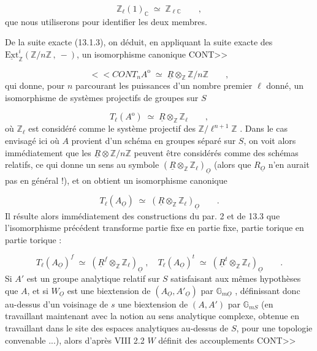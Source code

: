 \begin{equation*}
\mathbb{Z}_{\ell}(1)_{\mathbb{C}} \;\simeq\; \mathbb{Z}_{\ell\mathbb{C}} \qquad ,
\end{equation*}
que nous utiliserons pour identifier les deux membres.

De la suite exacte (13.1.3), on déduit, en appliquant la suite exacte des $\underline{\mathrm{Ext}}^{i}_{\mathbb{Z}}(\mathbb{Z}/n\mathbb{Z}\,,\ -)$, un isomorphisme canonique CONT>>



\begin{equation}\tag{13.5.5}
<<CONT {}_{n}A^{\mathrm{o}} \;\simeq\; \underline{R}\otimes_{\mathbb{Z}}\mathbb{Z}/n\mathbb{Z} \qquad ,
\end{equation}
qui donne, pour $n$ parcourant les puissances d'un nombre premier $\ell$ donné, un isomorphisme de systèmes projectifs de groupes sur $S$

\begin{equation}\tag{13.5.6}
T_{\ell}(A^{\mathrm{o}}) \;\simeq\; \underline{R}\otimes_{\mathbb{Z}}\mathbb{Z}_{\ell} \qquad ,
\end{equation}
où $\mathbb{Z}_{\ell}$ est considéré comme le système projectif des $\mathbb{Z}/\ell^{n+1}\mathbb{Z}$ . Dans le cas envisagé ici où $A$ provient d'un schéma en groupes séparé sur $S$, on voit alors immédiatement que les $\underline{R}\otimes\mathbb{Z}/n\mathbb{Z}$ peuvent être considérés comme des schémas relatifs, ce qui donne un sens au symbole $(\underline{R}\otimes_{\mathbb{Z}}\mathbb{Z}_{\ell})_{\underline{O}}$ (alors que $R_{\underline{O}}$ n'en aurait pas en général !), et on obtient un isomorphisme canonique

\begin{equation}\tag{13.5.7}
T_{\ell}(A_{\underline{O}}) \;\simeq\; (\underline{R}\otimes_{\mathbb{Z}}\mathbb{Z}_{\ell})_{\underline{O}} \qquad .
\end{equation}
Il résulte alors immédiatement des constructions du par. 2 et de 13.3 que l'isomorphisme précédent transforme partie fixe en partie fixe, partie torique en partie torique :

\begin{equation}\tag{13.5.8}
T_{\ell}(A_{\underline{O}})^{f} \;\simeq\; (\underline{R}^{f}\otimes_{\mathbb{Z}}\mathbb{Z}_{\ell})_{\underline{O}} \;,\quad T_{\ell}(A_{\underline{O}})^{t} \;\simeq\; (\underline{R}^{t}\otimes_{\mathbb{Z}}\mathbb{Z}_{\ell})_{\underline{O}} \qquad .
\end{equation}
Si $A'$ est un groupe analytique relatif sur $S$ satisfaisant aux mêmes hypothèses que $A$, et si $W_{\underline{O}}$ est une biextension de $(A_{\underline{O}},A'_{\underline{O}})$ par $\mathbb{G}_{m\underline{O}}$ , définissant donc au-dessus d'un voisinage de $s$ une biextension de $(A,A')$ par $\mathbb{G}_{mS}$ (en travaillant maintenant avec la notion au sens analytique complexe, obtenue en travaillant dans le site des espaces analytiques au-dessus de $S$, pour une topologie convenable ...), alors d'après VIII 2.2 $W$ définit des accouplements CONT>>


